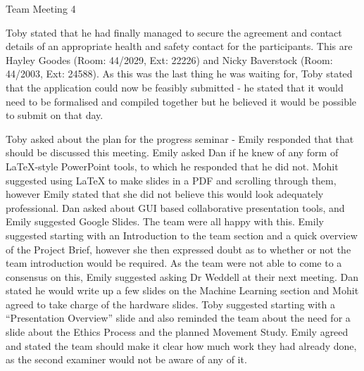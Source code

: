 \documentclass{article}
\begin{document}
\begin{Minutes}{Team Meeting 4}

Toby stated that he had finally managed to secure the agreement and contact details of an appropriate health and safety contact for the participants. This are Hayley Goodes (Room: 44/2029, Ext: 22226) and Nicky Baverstock (Room: 44/2003, Ext: 24588).
As this was the last thing he was waiting for, Toby stated that the application could now be feasibly submitted - he stated that it would need to be formalised and compiled together but he believed it would be possible to submit on that day.


Toby asked about the plan for the progress seminar - Emily responded that that should be discussed this meeting.
Emily asked Dan if he knew of any form of LaTeX-style PowerPoint tools, to which he responded that he did not. Mohit suggested using LaTeX to make slides in a PDF and scrolling through them, however Emily stated that she did not believe this would look adequately professional.
Dan asked about GUI based collaborative presentation tools, and Emily suggested Google Slides. The team were all happy with this.
Emily suggested starting with an Introduction to the team section and a quick overview of the Project Brief, however she then expressed doubt as to whether or not the team introduction would be required. As the team were not able to come to a consensus on this, Emily suggested asking Dr Weddell at their next meeting.
Dan stated he would write up a few slides on the Machine Learning section and Mohit agreed to take charge of the hardware slides. Toby suggested starting with a ``Presentation Overview'' slide and also reminded the team about the need for a slide about the Ethics Process and the planned Movement Study. Emily agreed and stated the team should make it clear how much work they had already done, as the second examiner would not be aware of any of it.



\end{Minutes}
\end{document}
